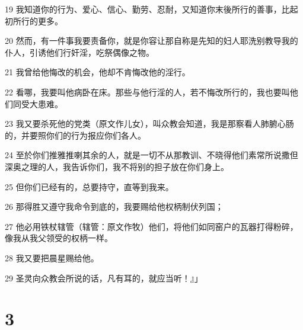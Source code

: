 \par 19 我知道你的行为、爱心、信心、勤劳、忍耐，又知道你末後所行的善事，比起初所行的更多。
\par 20 然而，有一件事我要责备你，就是你容让那自称是先知的妇人耶洗别教导我的仆人，引诱他们行奸淫，吃祭偶像之物。
\par 21 我曾给他悔改的机会，他却不肯悔改他的淫行。
\par 22 看哪，我要叫他病卧在床。那些与他行淫的人，若不悔改所行的，我也要叫他们同受大患难。
\par 23 我又要杀死他的党类（原文作儿女），叫众教会知道，我是那察看人肺腑心肠的，并要照你们的行为报应你们各人。
\par 24 至於你们推雅推喇其余的人，就是一切不从那教训、不晓得他们素常所说撒但深奥之理的人，我告诉你们，我不将别的担子放在你们身上。
\par 25 但你们已经有的，总要持守，直等到我来。
\par 26 那得胜又遵守我命令到底的，我要赐给他权柄制伏列国；
\par 27 他必用铁杖辖管（辖管：原文作牧）他们，将他们如同窑户的瓦器打得粉碎，像我从我父领受的权柄一样。
\par 28 我又要把晨星赐给他。
\par 29 圣灵向众教会所说的话，凡有耳的，就应当听！』」

\chapter{3}

